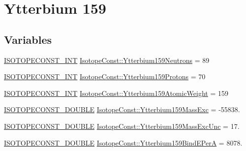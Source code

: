 \hypertarget{group___isotope_const-_ytterbium-_yb159}{}\section{Ytterbium 159}
\label{group___isotope_const-_ytterbium-_yb159}
\subsection*{Variables}
\begin{DoxyCompactItemize}
\item 
\mbox{\hyperlink{group___isotope_const-_macros_ga5f18360b3e99483a35c32d789e62621c}{I\+S\+O\+T\+O\+P\+E\+C\+O\+N\+S\+T\+\_\+\+I\+NT}} \mbox{\hyperlink{group___isotope_const-_ytterbium-_yb159_ga99b4e1a45dd2f1513c766ee025e94d7b}{Isotope\+Const\+::\+Ytterbium159\+Neutrons}} = 89
\item 
\mbox{\hyperlink{group___isotope_const-_macros_ga5f18360b3e99483a35c32d789e62621c}{I\+S\+O\+T\+O\+P\+E\+C\+O\+N\+S\+T\+\_\+\+I\+NT}} \mbox{\hyperlink{group___isotope_const-_ytterbium-_yb159_ga24cffa800d54f11c3714c310dae27468}{Isotope\+Const\+::\+Ytterbium159\+Protons}} = 70
\item 
\mbox{\hyperlink{group___isotope_const-_macros_ga5f18360b3e99483a35c32d789e62621c}{I\+S\+O\+T\+O\+P\+E\+C\+O\+N\+S\+T\+\_\+\+I\+NT}} \mbox{\hyperlink{group___isotope_const-_ytterbium-_yb159_gaef585e6882948ca3ecb2fc2237845bc8}{Isotope\+Const\+::\+Ytterbium159\+Atomic\+Weight}} = 159
\item 
\mbox{\hyperlink{group___isotope_const-_macros_ga8f45a7272ce02c0b4c65c44636ed719a}{I\+S\+O\+T\+O\+P\+E\+C\+O\+N\+S\+T\+\_\+\+D\+O\+U\+B\+LE}} \mbox{\hyperlink{group___isotope_const-_ytterbium-_yb159_ga84383c67669e3428209be6db05aad699}{Isotope\+Const\+::\+Ytterbium159\+Mass\+Exc}} = -\/55838.
\item 
\mbox{\hyperlink{group___isotope_const-_macros_ga8f45a7272ce02c0b4c65c44636ed719a}{I\+S\+O\+T\+O\+P\+E\+C\+O\+N\+S\+T\+\_\+\+D\+O\+U\+B\+LE}} \mbox{\hyperlink{group___isotope_const-_ytterbium-_yb159_gac594cd025914ae5ab476cc5567b4f46e}{Isotope\+Const\+::\+Ytterbium159\+Mass\+Exc\+Unc}} = 17.
\item 
\mbox{\hyperlink{group___isotope_const-_macros_ga8f45a7272ce02c0b4c65c44636ed719a}{I\+S\+O\+T\+O\+P\+E\+C\+O\+N\+S\+T\+\_\+\+D\+O\+U\+B\+LE}} \mbox{\hyperlink{group___isotope_const-_ytterbium-_yb159_ga72ba45cd8cb2291f0c5297e8a917f8fe}{Isotope\+Const\+::\+Ytterbium159\+Bind\+E\+PerA}} = 8078.
\item 

\end{DoxyCompactItemize}
